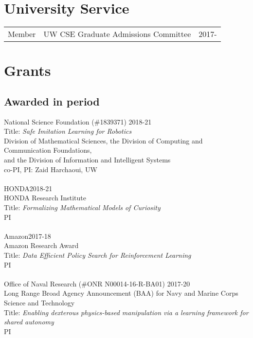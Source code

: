 \documentclass[10pt]{article}
\begin{document}
\section{University Service}
\begin{tabularx}{\linewidth}{rXr}
Member & UW CSE Graduate Admissions Committee & 2017- \\
\end{tabularx}



\section{Grants}

\subsection{Awarded in period}
\noindent
National Science Foundation (\#1839371) \hfill 2018-21\\
Title: \textit{Safe Imitation Learning for Robotics}\\
Division of Mathematical Sciences, the Division of Computing and Communication Foundations,\\and the Division of Information and Intelligent Systems\\
co-PI, PI: Zaid Harchaoui, UW\\
\\
HONDA\hfill 2018-21\\
HONDA Research Institute\\
Title: \textit{Formalizing Mathematical Models of Curiosity}\\
PI\\
\\
Amazon\hfill 2017-18\\
Amazon Research Award\\
Title: \textit{Data Efficient Policy Search for Reinforcement Learning}\\
PI\\
\\
Office of Naval Research (\#ONR N00014-16-R-BA01) \hfill 2017-20\\
Long Range Broad Agency Announcement (BAA) for Navy and Marine Corps Science and Technology\\
Title: \textit{Enabling dexterous physics-based manipulation via a learning framework for shared autonomy}\\
PI\\
\end{document}

